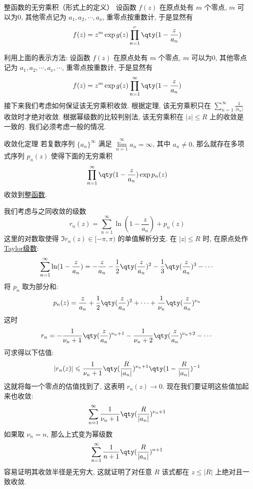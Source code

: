 \documentclass[UTF8]{ctexart}
\begin{document}
        \begin{dfn}
            {整函数的无穷乘积（形式上的定义）}
            设函数 \(f(z)\) 在原点处有 \(m\) 个零点,  \(m\) 可以为0, 其他零点记为 \(a_1,a_2,\cdots, a_\nu\), 重零点按重数计, 于是显然有
            \[f(z)=z^m\exp g(z)\prod_{n=1}^{\nu}\qty(1-\frac{z}{a_n})\]
        \end{dfn}

        利用上面的表示方法: 设函数 \(f(z)\) 在原点处有 \(m\) 个零点,  \(m\) 可以为0, 其他零点记为 \(a_1,a_2,\cdots, a_\nu, \cdots\), 重零点按重数计, 于是显然有
        \[f(z)=z^m\exp g(z)\prod_{n=1}^{\infty}\qty(1-\frac{z}{a_n})\]
        接下来我们考虑如何保证该无穷乘积收敛. 根据定理, 该无穷乘积只在 \(\sum\limits_{n=1}^{\infty}\frac{1}{|a_n|}\) 收敛时才绝对收敛. 根据幂级数的比较判别法, 该无穷乘积在 \(|z|\leqslant R\) 上的收敛是一致的. 我们必须考虑一般的情况. 

        \begin{thm}
            {收敛化定理}
            若复数序列 \(\{a_n\}^\infty\) 满足 \(\lim\limits_{n=1}^{\infty}a_n=\infty\), 其中 \(a_n\neq 0\), 那么就存在多项式序列 \(p_n(z)\) 使得下面的无穷乘积
            \[\prod_{n=1}^{\infty}\qty(1-\frac{z}{a_n})\exp p_n(z)\]
            收敛到\hyperref[dfn:EntireFunction]{整函数}.
        \end{thm}

        \begin{prf}
            我们考虑与之同收敛的级数
            \[r_n(z)=\sum_{n=1}^{\infty}\ln(1-\frac{z}{a_n})+p_n(z)\]
            这里的对数取使得 \(\Im r_n(z)\in[-\pi,\pi)\) 的单值解析分支. 在 \(|z|\leqslant R\) 时, 在原点处作\hyperref[thm:TaylorSeries]{Taylor级数}:
            \[\sum_{n=1}^{\infty}\ln(1-\frac{z}{a_n})=-\frac{z}{a_n}-\frac{1}{2}\qty(\frac{z}{a_n})^2-\frac{1}{3}\qty(\frac{z}{a_n})^3-\cdots\]
            将 \(p_n\) 取为部分和: 
            \[p_n(z)=\frac{z}{a_n}+\frac{1}{2}\qty(\frac{z}{a_n})^2+\cdots+\frac{1}{\nu_n}\qty(\frac{z}{a_n})^{\nu_n}\]
            这时
            \[r_n=-\frac{1}{\nu_n+1}\qty(\frac{z}{a_n})^{\nu_n+1}-\frac{1}{\nu_n+2}\qty(\frac{z}{a_n})^{\nu_n+2}-\cdots\]
            可求得以下估值: 
            \[|r_n(z)|\leqslant\frac{1}{\nu_n+1}\qty(\frac{R}{|a_n|})^{\nu_n+1}\qty(1-\frac{R}{|a_n|})^{-1} \]
            这就将每一个零点的估值找到了, 这表明 \(r_n(z)\to 0\). 现在我们要证明这些值加起来也收敛: 
            \[\sum_{n=1}^{\infty}\frac{1}{\nu_n+1}\qty(\frac{R}{|a_n|})^{\nu_n+1}\]
            如果取 \(\nu_n=n\), 那么上式变为幂级数
            \[\sum_{n=1}^{\infty}\frac{1}{n+1}\qty(\frac{R}{|a_n|})^{n+1}\]
            容易证明其收敛半径是无穷大, 这就证明了对任意 \(R\) 该式都在 \(z\leq|R|\) 上绝对且一致收敛. 
        \end{prf}
\end{document}
